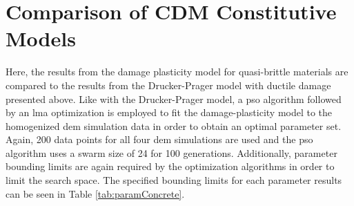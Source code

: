 \section{Comparison of CDM Constitutive Models}

Here, the results from the damage plasticity model for quasi-brittle materials are compared to the results from the Drucker-Prager model with ductile damage presented above. Like with the Drucker-Prager model, a \acrshort{pso} algorithm followed by an \acrshort{lma} optimization is employed to fit the damage-plasticity model to the homogenized \acrshort{dem} simulation data in order to obtain an optimal parameter set. Again, 200 data points for all four \acrshort{dem} simulations are used and the \acrshort{pso} algorithm uses a swarm size of 24 for 100 generations. Additionally, parameter bounding limits are again required by the optimization algorithms in order to limit the search space. The specified bounding limits for each parameter results can be seen in Table \ref{tab:paramConcrete}.

